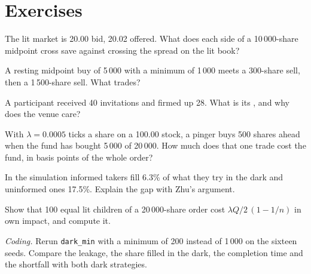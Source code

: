 \section{Exercises}

\begin{exercise}[$\star$]\label{exo:mx:dark-pools-and-blocks:1}
The lit market is 20.00 bid, 20.02 offered. What does each side of a 10\,000-share midpoint cross save against crossing the spread on the lit book?
\end{exercise}

\begin{exercise}[$\star$]\label{exo:mx:dark-pools-and-blocks:2}
A resting midpoint buy of 5\,000 with a minimum of 1\,000 meets a 300-share sell, then a 1\,500-share sell. What trades?
\end{exercise}

\begin{exercise}[$\star$]\label{exo:mx:dark-pools-and-blocks:3}
A participant received 40 invitations and firmed up 28. What is its , and why does the venue care?
\end{exercise}

\begin{exercise}[$\star\star$]\label{exo:mx:dark-pools-and-blocks:4}
With $\lambda=0.0005$ ticks a share on a 100.00 stock, a pinger buys 500 shares ahead when the fund has bought 5\,000 of 20\,000. How much does that one
trade cost the fund, in basis points of the whole order?
\end{exercise}

\begin{exercise}[$\star\star$]\label{exo:mx:dark-pools-and-blocks:5}
In the simulation informed takers fill 6.3\% of what they try in the dark and uninformed ones 17.5\%. Explain the gap with Zhu's argument.
\end{exercise}

\begin{exercise}[$\star\star$]\label{exo:mx:dark-pools-and-blocks:6}
Show that 100 equal lit children of a 20\,000-share order cost $\lambda Q/2\,(1-1/n)$ in own impact, and compute it.
\end{exercise}

\begin{exercise}[$\star\star\star$]\label{exo:mx:dark-pools-and-blocks:7}
\emph{Coding.} Rerun \texttt{dark\_min} with a minimum of 200 instead of 1\,000 on the sixteen seeds. Compare the leakage, the share filled in the dark,
the completion time and the shortfall with both dark strategies.
\end{exercise}

